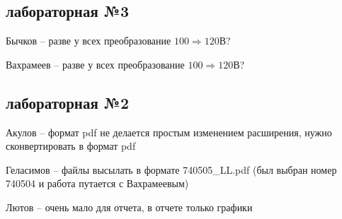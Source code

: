 \documentclass[a4paper,11pt]{article}
\begin{document}
\newpage
{}
\recalctypearea
\subsection*{лабораторная №3}

Бычков -- разве у всех преобразование $100 \Rightarrow 120$В?

Вахрамеев -- разве у всех преобразование $100 \Rightarrow 120$В?

\subsection*{лабораторная №2}
Акулов -- формат pdf не делается простым изменением расширения, нужно сконвертировать в формат pdf

Геласимов -- файлы высылать в формате 740505\_LL.pdf (был выбран номер 740504 и работа путается с Вахрамеевым)

Лютов -- очень мало для отчета, в отчете только графики
\end{document}
